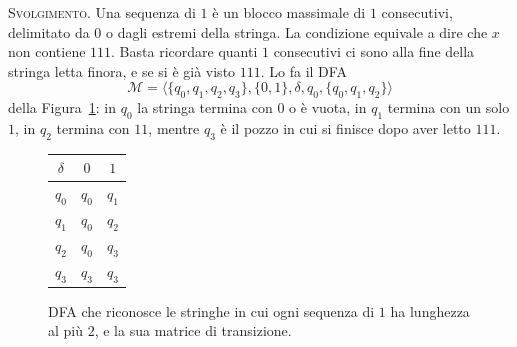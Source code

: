 \documentclass[a4paper, 11pt, oneside]{book}
\theoremstyle{formale}
\begin{document}
    \textsc{Svolgimento}. Una sequenza di $1$ \`e un blocco massimale di $1$ consecutivi,
    delimitato da $0$ o dagli estremi della stringa. La condizione equivale a
    dire che $x$ non contiene $111$. Basta ricordare quanti $1$ consecutivi ci sono alla
    fine della stringa letta finora, e se si \`e gi\`a visto $111$. Lo fa il DFA
    \begin{equation*}
        \mathcal{M} = \langle \{q_0, q_1, q_2, q_3\}, \{0, 1\}, \delta, q_0,
            \{q_0, q_1, q_2\} \rangle
    \end{equation*}
    della Figura~\ref{fig:es-max-due-uni}: in $q_0$ la stringa termina con $0$ o \`e
    vuota, in $q_1$ termina con un solo $1$, in $q_2$ termina con $11$, mentre $q_3$ \`e
    il pozzo in cui si finisce dopo aver letto $111$.

    \begin{figure}[H]
        \centering

        \bigskip
        \begin{tabular}{ccc}
            \toprule
            $\delta$ & $0$ & $1$ \\
            \midrule
            $q_0$ & $q_0$ & $q_1$ \\
            $q_1$ & $q_0$ & $q_2$ \\
            $q_2$ & $q_0$ & $q_3$ \\
            $q_3$ & $q_3$ & $q_3$ \\
            \bottomrule
        \end{tabular}
        \caption{DFA che riconosce le stringhe in cui ogni sequenza di $1$ ha lunghezza
            al pi\`u $2$, e la sua matrice di transizione.}
        \label{fig:es-max-due-uni}
    \end{figure}
\end{document}
